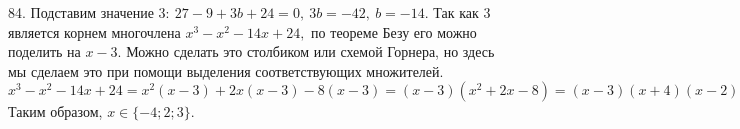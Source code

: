 84. Подставим значение $3:\ 27-9+3b+24=0,\ 3b=-42,\ b=-14.$ Так как 3 является корнем многочлена $x^3-x^2-14x+24,$ по теореме Безу его можно поделить на $x-3.$ Можно сделать это столбиком или схемой Горнера, но здесь мы сделаем это при помощи выделения соответствующих множителей.
$x^3-x^2-14x+24=x^2(x-3)+2x(x-3)-8(x-3)=(x-3)(x^2+2x-8)=(x-3)(x+4)(x-2)=0.$ Таким образом, $x\in\{-4; 2; 3\}.$\\
